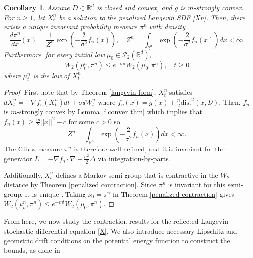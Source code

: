 \documentclass[amsfonts, reqno]{amsart}
\newtheorem{cor}[thm]{Corollary}
\theoremstyle{definition}
\theoremstyle{remark}
\newcommand{\bbR}{\mathbb{R}}
\newcommand{\dist}{\text{dist}}
\numberwithin{equation}{section}
\begin{document}
\begin{cor}\label{inv Xn}
Assume $D \subset \bbR^d$ is closed and convex, and $g$ is $m$-strongly convex. For $n \geq 1$, let $X_t^n$ be a solution to the penalized Langevin SDE \eqref{Xn}. Then, there exists a unique invariant probability measure $\pi^n$ with density
\begin{equation*}
    \frac{d\pi^n}{dx}(x) = \frac{1}{Z^n}\exp\left( -\frac{2}{\sigma^2} f_n(x) \right), \quad Z^n = \int_{\bbR^d} \exp\left( -\frac{2}{\sigma^2} f_n(x) \right) dx < \infty.
\end{equation*}
Furthermore, for every initial law $\mu_0 \in \mathcal{P}_2(\bbR^d)$, \begin{equation*}
    W_2(\mu_t^n, \pi^n) \leq e^{-mt}W_2(\mu_0, \pi^n), \quad t \geq 0
\end{equation*}
where $\mu_t^n$ is the law of $X_t^n.$
\end{cor}
\begin{proof}
    First note that by Theorem \ref{langevin form}, $X_t^n$ satisfies $dX_t^n = -\nabla f_n(X_t^n)dt + \sigma dW_t^n$ where $f_n(x) = g(x) + \frac{n}{2}\dist^2(x,D)$. Then, $f_n$ is $m$-strongly convex by Lemma \ref{f convex thm} which implies that $f_n(x) \geq \frac{m}{2}||x||^2 - c$ for some $c > 0$ so \begin{equation*}
        Z^n = \int_{\bbR^d}\exp\left( -\frac{2}{\sigma^2} f_n(x) \right) dx < \infty.
    \end{equation*}
    The Gibbs measure $\pi^n$ is therefore well defined, and it is invariant for the generator $L = -\nabla f_n \cdot \nabla + \frac{\sigma^2}{2} \Delta$ via integration-by-parts.

    Additionally, $X_t^n$ defines a Markov semi-group that is contractive in the $W_2$ distance by Theorem \ref{penalized contraction}. Since $\pi^n$ is invariant for this semi-group, it is unique \cites{Durmus2019,Ambrosio2009}. Taking $\nu_0 = \pi^n$ in Theorem \ref{penalized contraction} gives $W_2(\mu_t^n, \pi^n) \leq e^{-mt}W_2(\mu_0,\pi^n)$.
\end{proof}

From here, we now study the contraction results for the reflected Langevin stochastic differential equation \eqref{X}. We also introduce necessary Lipschitz and geometric drift conditions on the potential energy function to construct the bounds, as done in \cites{Durmus2019, Eberle2019, Lamperski2021, slominski2013, Slominski2001}.
\end{document}
